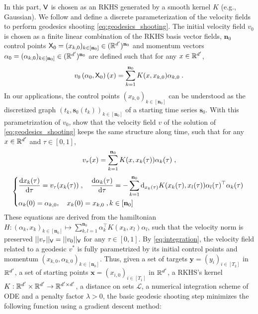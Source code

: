 In this part, $\mathsf{V}$ is chosen as an RKHS \cite{berlinet2011reproducing} generated by a smooth kernel $K$ (e.g., Gaussian). We follow \cite{durrleman2013sparse} and define a discrete parameterization of the velocity fields to perform geodesics shooting \eqref{eq:geodesics_shooting}. The initial velocity field $v_0$ is chosen as a finite linear combination of the RKHS basis vector fields, 
$\mathbf{n}_0$ control points $\mathsf{X}_0=(x_{k,0})_{k\in[\mathbf{n}_0]}\in (\mathbb{R}^{d'})^{\mathbf{n}_0}$ and momentum vectors $\alpha_0=(\alpha_{k,0})_{k\in[\mathbf{n}_0]}\in (\mathbb{R}^{d'})^{\mathbf{n}_0} $ are defined such that for any $x\in \mathbb{R}^{d'}$, 
\begin{equation}
  \label{eq:def_v0}
  v_0\left(\alpha_0,\mathsf{X}_0\right)(x)=\sum_{k=1}^{\mathbf{n}_0} K(x,x_{k,0})\alpha_{k,0} \; .
\end{equation}
In our applications, the control points $(x_{k,0})_{k\in[\mathbf{n}_0]}$ can be understood as the discretized graph $(t_k,\mathbf{s}_0(t_k))_{k\in[\mathbf{n}_0]}$ of a starting time series $\mathbf{s}_0$. With this parametrization of $v_0$, \cite{miller2006geodesic} show that the velocity field $v$ of the solution of \eqref{eq:geodesics_shooting} keeps the same structure along time, such that for any $x\in\mathbb{R}^{d'}$ and $\tau\in[0,1]$, 
\begin{equation}
  \label{eq:specific_form}
  v_\tau(x)=\sum_{k=1}^{\mathbf{n}_0} K(x,x_k(\tau))\alpha_{k}(\tau) \; ,
\end{equation}
\begin{equation} 
  \label{eq:integration}
    \left\{
      \begin{aligned}
      & \frac{\mathop{}\!\mathrm{d} x_k(\tau)}{\mathop{}\!\mathrm{d} \tau}=v_\tau(x_k(\tau)) \;, \quad
      \frac{\mathop{}\!\mathrm{d} \alpha_k(\tau)}{\mathop{}\!\mathrm{d} \tau}=-\sum_{k=1}^{\mathbf{n}_0} \mathop{}\!\mathrm{d}_{x_k(\tau)} K(x_k(\tau),x_l(\tau))\alpha_{l}(\tau)^\top \alpha_{k}(\tau) \;  \\
      & \alpha_k(0)=\alpha_{k,0},\quad x_k(0)=x_{k,0} \; , k\in[\mathbf{n}_0] 
      \end{aligned}
      \right .
\end{equation}
These equations are derived from the hamiltonian $H:(\alpha_k,x_k)_{k\in [\mathbf{n}_0]}\mapsto \sum_{k,l=1}^{\mathbf{n}_0} \alpha_{k}^\top K(x_k,x_l)\alpha_{l}  $, such that the velocity norm is preserved $||v_\tau||_{\mathsf{V}}=||v_0||_{\mathsf{V}} $ for any $\tau\in [0,1]$. By \eqref{eq:integration}, the velocity field related to a geodesic $v^*$ is fully parametrized by its initial control points and momentum $(x_{k,0},\alpha_{k,0})_{k\in[\mathbf{n}_0]}$. Thus, given a set of targets $\mathbf{y}=(y_i)_{i\in[T_2]}$ in $\mathbb{R}^{d'}$, a set of starting points $\mathbf{x}=(x_{i,0})_{i\in[T_1]}$ in $\mathbb{R}^{d'}$, a RKHS's kernel $K:\mathbb{R}^{d'}\times \mathbb{R}^{d'}\to \mathbb{R}^{d'\times d'}$, a distance on sets $\mathscr{L}$, a numerical integration scheme of ODE and a penalty factor $\lambda>0$, the basic geodesic shooting step minimizes the following function using a gradient descent method:
